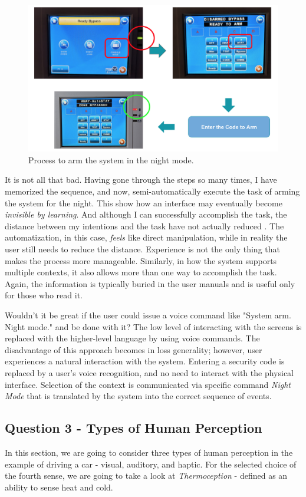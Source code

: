 \documentclass[12pt,letterpaper]{article}
\begin{document}
\begin{figure}[h]
\centering
\includegraphics[scale=.5]{figures/p2/alarm.png}
\caption{Process to arm the system in the night mode.}
\label{fig::3}
\end{figure}

It is not all that bad. Having gone through the steps so many times, I have memorized the sequence, and now, semi-automatically execute the task of arming the system for the night. This show how an interface may eventually become \textit{invisible by learning}. And although I can successfully accomplish the task, the distance between my intentions and the task have not actually reduced \cite{hutchins1985direct}. The automatization, in this case, \textit{feels} like direct manipulation, while in reality the user still needs to reduce the distance. Experience is not the only thing that makes the process more manageable. Similarly, in how the system supports multiple contexts, it also allows more than one way to accomplish the task. Again, the information is typically buried in the user manuals and is useful only for those who read it.

Wouldn't it be great if the user could issue a voice command like "System arm. Night mode." and be done with it? The low level of interacting with the screens is replaced with the higher-level language by using voice commands. The disadvantage of this approach becomes in loss generality; however, user experiences a natural interaction with the system. Entering a security code is replaced by a user's voice recognition, and no need to interact with the physical interface. Selection of the context is communicated via specific command \textit{Night Mode} that is translated by the system into the correct sequence of events.

\subsection*{Question 3 - Types of Human Perception}
In this section, we are going to consider three types of human perception in the example of driving a car - visual, auditory, and haptic. For the selected choice of the fourth sense, we are going to take a look at \textit{Thermoception} - defined as an ability to sense heat and cold. 
\end{document}
